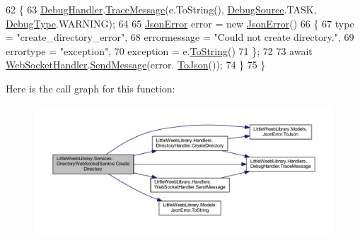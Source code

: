 \begin{DoxyCode}
62             \{
63                 \mbox{\hyperlink{class_little_weeb_library_1_1_handlers_1_1_debug_handler}{DebugHandler}}.\mbox{\hyperlink{class_little_weeb_library_1_1_handlers_1_1_debug_handler_afccb37dfd6b2114af72000c2f4fe4607}{TraceMessage}}(e.ToString(), 
      \mbox{\hyperlink{namespace_little_weeb_library_1_1_handlers_a2a6ca0775121c9c503d58aa254d292be}{DebugSource}}.TASK, \mbox{\hyperlink{namespace_little_weeb_library_1_1_handlers_ab66019ed40462876ec4e61bb3ccb0a62}{DebugType}}.WARNING);
64 
65                 \mbox{\hyperlink{class_little_weeb_library_1_1_models_1_1_json_error}{JsonError}} error = \textcolor{keyword}{new} \mbox{\hyperlink{class_little_weeb_library_1_1_models_1_1_json_error}{JsonError}}()
66                 \{
67                     type = \textcolor{stringliteral}{"create\_directory\_error"},
68                     errormessage = \textcolor{stringliteral}{"Could not create directory."},
69                     errortype = \textcolor{stringliteral}{"exception"},
70                     exception = e.\mbox{\hyperlink{class_little_weeb_library_1_1_models_1_1_json_error_ad7d5522c90119111d2e929f39e7f6d3c}{ToString}}()
71                 \};
72 
73                 await \mbox{\hyperlink{class_little_weeb_library_1_1_handlers_1_1_web_socket_handler}{WebSocketHandler}}.\mbox{\hyperlink{class_little_weeb_library_1_1_handlers_1_1_web_socket_handler_a1de289d54d665a32c93478c68d3e6ad0}{SendMessage}}(error.
      \mbox{\hyperlink{class_little_weeb_library_1_1_models_1_1_json_error_a0e3e7dd2e2990404b7f0461742b23440}{ToJson}}());
74             \}
75         \}
\end{DoxyCode}
Here is the call graph for this function\+:\nopagebreak
\begin{figure}[H]
\begin{center}
\leavevmode
\includegraphics[width=350pt]{class_little_weeb_library_1_1_services_1_1_directory_web_socket_service_a3ea6566e0d21d73d331adce1ae9c7f07_cgraph}
\end{center}
\end{figure}
